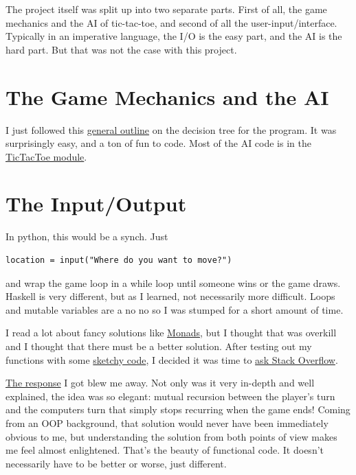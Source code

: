 \documentclass[12pt]{article}
\begin{document}
	The project itself was split up into two separate parts. First of all,
	the game mechanics and the AI of tic-tac-toe, and second of all the
	user-input/interface. Typically in an imperative language, the I/O is
	the easy part, and the AI is the hard part. But that was not the case
	with this project.

	\section{The Game Mechanics and the
	AI}\label{the-game-mechanics-and-the-ai}

	I just followed this
	\href{http://programmers.stackexchange.com/questions/213559/algorithm-to-create-an-tictactoe-game-ai}{general
	outline} on the decision tree for the program. It was surprisingly easy,
	and a ton of fun to code. Most of the AI code is in the
	\href{https://github.com/2016rshah/Tic-Hack-Toe/blob/master/src/TicTacToe.hs}{TicTacToe
	module}.

	\section{The Input/Output}\label{the-inputoutput}

	In python, this would be a synch. Just

	\begin{lstlisting}
location = input("Where do you want to move?")
	\end{lstlisting}

	and wrap
	the game loop in a while loop until someone wins or the game draws.
	Haskell is very different, but as I learned, not necessarily more
	difficult. Loops and mutable variables are a no no so I was stumped for
	a short amount of time.

	I read a lot about fancy solutions like
	\href{http://projects.haskell.org/operational/examples/TicTacToe.hs.html}{Monads},
	but I thought that was overkill and I thought that there must be a
	better solution. After testing out my functions with some
	\href{https://github.com/2016rshah/Tic-Hack-Toe/commit/201ef6f4ab5bdcd74675f582dcabe47468d49522}{sketchy
	code}, I decided it was time to
	\href{http://stackoverflow.com/questions/32670948/take-input-from-user-until-tic-tac-toe-game-ends}{ask
	Stack Overflow}.

	\href{http://stackoverflow.com/a/32671373/3861396}{The response} I got
	blew me away. Not only was it very in-depth and well explained, the idea
	was so elegant: mutual recursion between the player's turn and the
	computers turn that simply stops recurring when the game ends! Coming
	from an OOP background, that solution would never have been immediately
	obvious to me, but understanding the solution from both points of view
	makes me feel almost enlightened. That's the beauty of functional code.
	It doesn't necessarily have to be better or worse, just different.
\end{document}
